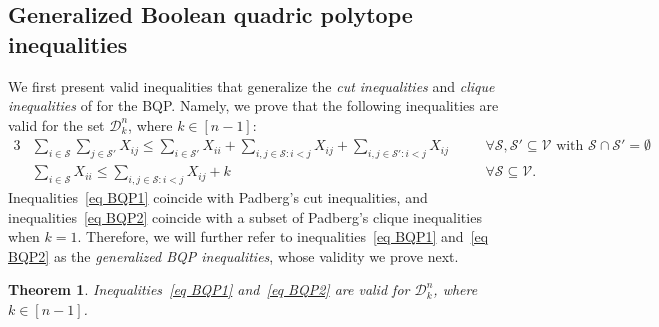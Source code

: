 \documentclass[11pt, a4paper]{article}
\newtheorem{theorem}{Theorem}[section]
\newcommand{\mc}{\mathcal}
\begin{document}
\subsection{Generalized Boolean quadric polytope inequalities} \label{Sec: Boolean quadric polytope inequalities}
We first present valid inequalities that generalize the \textit{cut inequalities} and \textit{clique inequalities} of \citet{Padberg1989BQP} for the BQP. 
Namely, we prove that the following inequalities are valid for the set $\mc{D}^n_k$, where $k \in [n-1]$:
\begin{alignat}{3}
    & \sum_{i \in \mc{S}}\sum_{j \in \mc{S}'} X_{ij} \leq \sum_{i \in \mc{S}'}X_{ii} + \sum_{i,j \in \mc{S}: i<j} X_{ij} + \sum_{i,j \in \mc{S}': i<j} X_{ij} &\quad& \forall \mc{S}, \mc{S}' \subseteq \mc{V} \text{ with } \mc{S} \cap \mc{S}' = \emptyset \label{eq BQP1} \\
    & \sum_{i \in \mc{S}} X_{ii} \leq \sum_{i,j \in \mc{S}: i<j} X_{ij} + k &\quad& \forall \mc{S} \subseteq \mc{V}. \label{eq BQP2}
\end{alignat}
Inequalities~\eqref{eq BQP1} coincide with Padberg's cut inequalities, and inequalities~\eqref{eq BQP2} coincide with a subset of Padberg's clique inequalities when $k=1$.
Therefore, we will further refer to inequalities~\eqref{eq BQP1} and~\eqref{eq BQP2} as the \textit{generalized BQP inequalities}, whose validity we prove next.
\begin{theorem}\label{thm:bqp1}
    Inequalities~\eqref{eq BQP1} and~\eqref{eq BQP2} are valid for $\mc{D}^n_k$, 
    where $k \in [n-1]$.
\end{theorem}
\end{document}
